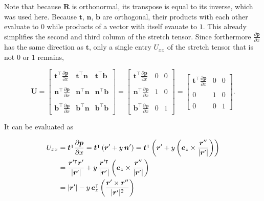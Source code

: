 Note that because $\boldsymbol{R}$ is orthonormal, its transpose is equal to its inverse, which was used here.
Because $\boldsymbol{t}$, $\boldsymbol{n}$, $\boldsymbol{b}$ are orthogonal, their products with each other evaluate to $0$ while products of a vector with itself evauate to $1$.
This already simplifies the second and third column of the stretch tensor.
Since forthermore $\frac{\partial\boldsymbol{p}}{\partial x}$ has the same direction as $\boldsymbol{t}$, only a single entry $U_{xx}$ of the stretch tensor that is not $0$ or $1$ remains,

\begin{equation}
\boldsymbol{U} =
\begin{bmatrix}
\boldsymbol{t}^\intercal\frac{\partial\boldsymbol{p}}{\partial x} & \boldsymbol{t}^\intercal\boldsymbol{n} & \boldsymbol{t}^\intercal\boldsymbol{b} \\
\\
\boldsymbol{n}^\intercal\frac{\partial\boldsymbol{p}}{\partial x} & \boldsymbol{n}^\intercal\boldsymbol{n} & \boldsymbol{n}^\intercal\boldsymbol{b} \\
\\
\boldsymbol{b}^\intercal\frac{\partial\boldsymbol{p}}{\partial x} & \boldsymbol{b}^\intercal\boldsymbol{n} & \boldsymbol{b}^\intercal\boldsymbol{b}
\end{bmatrix}
 =
\begin{bmatrix}
\boldsymbol{t}^\intercal\frac{\partial\boldsymbol{p}}{\partial x} & 0 & 0 \\
\\
\boldsymbol{n}^\intercal\frac{\partial\boldsymbol{p}}{\partial x} & 1 & 0 \\
\\
\boldsymbol{b}^\intercal\frac{\partial\boldsymbol{p}}{\partial x} & 0 & 1
\end{bmatrix}
=
\begin{bmatrix}
\boldsymbol{t}^\intercal\frac{\partial\boldsymbol{p}}{\partial x} & 0 & 0 \\
\\
0 & 1 & 0 \\
\\
0 & 0 & 1
\end{bmatrix}.
\end{equation}

It can be evaluated as

\begin{align}
U_{xx} &= \boldsymbol{t}^\intercal\frac{\partial\boldsymbol{p}}{\partial x} = \boldsymbol{t}^\intercal\left(\boldsymbol{r}' + y\,\boldsymbol{n}'\right) = \boldsymbol{t}^\intercal\left(\boldsymbol{r}' + y\left(\boldsymbol{e}_{z} \times \frac{\boldsymbol{r}''}{|\boldsymbol{r}'|}\right)\right) \notag \\
&= \frac{\boldsymbol{r}'^\intercal\boldsymbol{r}'}{|\boldsymbol{r}'|} + y\, \frac{\boldsymbol{r}'^\intercal}{|\boldsymbol{r}'|}\left(\boldsymbol{e}_{z} \times \frac{\boldsymbol{r}''}{|\boldsymbol{r}'|}\right) \notag \\
&= |\boldsymbol{r}'| - y\,\boldsymbol{e}_{z}^\intercal\left(\frac{\boldsymbol{r}' \times \boldsymbol{r}''}{|\boldsymbol{r}'|^2}\right)\label{eq:stretch-tensor-component}
\end{align}

